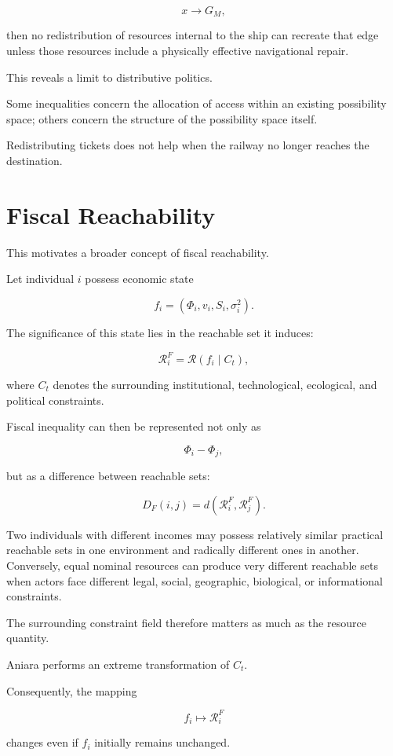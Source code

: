 \documentclass[11pt,oneside]{book}
\theoremstyle{definition}
\theoremstyle{remark}
\newcommand{\R}{\mathcal{R}}
\begin{document}
\[
x\rightarrow G_M,
\]

then no redistribution of resources internal to the ship can recreate that edge unless those resources include a physically effective navigational repair.

This reveals a limit to distributive politics.

Some inequalities concern the allocation of access within an existing possibility space; others concern the structure of the possibility space itself.

Redistributing tickets does not help when the railway no longer reaches the destination.

\section{Fiscal Reachability}

This motivates a broader concept of fiscal reachability.

Let individual \(i\) possess economic state

\[
f_i
=
(\Phi_i,v_i,S_i,\sigma_i^2).
\]

The significance of this state lies in the reachable set it induces:

\[
\R_i^{F}
=
\R(f_i\mid C_t),
\]

where \(C_t\) denotes the surrounding institutional, technological, ecological, and political constraints.

Fiscal inequality can then be represented not only as

\[
\Phi_i-\Phi_j,
\]

but as a difference between reachable sets:

\[
D_F(i,j)
=
d(
\R_i^{F},
\R_j^{F}
).
\]

Two individuals with different incomes may possess relatively similar practical reachable sets in one environment and radically different ones in another. Conversely, equal nominal resources can produce very different reachable sets when actors face different legal, social, geographic, biological, or informational constraints.

The surrounding constraint field therefore matters as much as the resource quantity.

Aniara performs an extreme transformation of \(C_t\).

Consequently, the mapping

\[
f_i\mapsto\R_i^{F}
\]

changes even if \(f_i\) initially remains unchanged.
\end{document}
